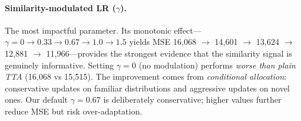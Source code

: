 \documentclass[journal]{IEEEtran}
\begin{document}
\begin{table}[t]
\centering
\caption{Hyperparameter sensitivity (MSE averaged over 4 datasets $\times$ 2 horizons $\times$ 3 seeds). Bold = default. TTA baseline = 15{,}515.}
\label{tab:ablation_main}
\small
{}%
\end{table}

\paragraph{Similarity-modulated LR ($\gamma$).} The most impactful parameter. Its monotonic effect---$\gamma = 0 \rightarrow 0.33 \rightarrow 0.67 \rightarrow 1.0 \rightarrow 1.5$ yields MSE 16{,}068 $\rightarrow$ 14{,}601 $\rightarrow$ 13{,}624 $\rightarrow$ 12{,}881 $\rightarrow$ 11{,}966---provides the strongest evidence that the similarity signal is genuinely informative. Setting $\gamma{=}0$ (no modulation) performs \emph{worse than plain TTA} (16{,}068 vs 15{,}515). The improvement comes from \emph{conditional allocation}: conservative updates on familiar distributions and aggressive updates on novel ones. Our default $\gamma{=}0.67$ is deliberately conservative; higher values further reduce MSE but risk over-adaptation.
\end{document}
